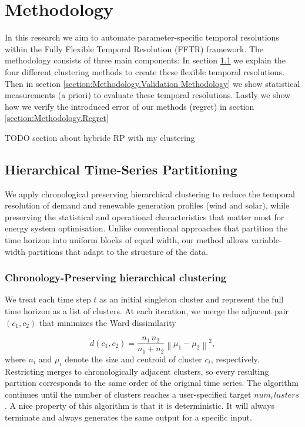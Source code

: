 \section{Methodology}
In this research we aim to automate parameter-specific temporal resolutions within the Fully Flexible Temporal Resolution (FFTR) framework. The methodology consists of three main components: 
In section \ref{section:Methodology.Hierarchical Time-Series Partitioning} we explain the four different clustering methods to create these flexible temporal resolutions. Then in section \ref{section:Methodology.Validation Methodology} we show statistical measurements (a priori) to evaluate these temporal resolutions. Lastly we show how we verify the introduced error of our methods (regret) in section \ref{section:Methodology.Regret} 

TODO section about hybride RP with my clustering

\subsection{Hierarchical Time-Series Partitioning}
\label{section:Methodology.Hierarchical Time-Series Partitioning}

We apply chronological preserving hierarchical clustering to reduce the temporal resolution of demand and renewable generation profiles (wind and solar), while preserving the statistical and operational characteristics that matter most for energy system optimisation. Unlike conventional approaches that partition the time horizon into uniform blocks of equal width, our method allows variable-width partitions that adapt to the structure of the data.

\subsubsection{Chronology-Preserving hierarchical clustering}

We treat each time step $t$ as an initial singleton cluster and represent the full time horizon as a list of clusters. At each iteration, we merge the adjacent pair $(c_1, c_2)$ that minimizes the Ward dissimilarity


\begin{equation}
\label{eq:ward_distance}
d(c_1, c_2) = \frac{n_1 \, n_2}{n_1 + n_2} \left\| \mu_1 - \mu_2 \right\|^2,
\end{equation}
\noindent
where $n_i$ and $\mu_i$ denote the size and centroid of cluster $c_i$, respectively. Restricting merges to chronologically adjacent clusters, so every resulting partition corresponds to the same order of the original time series. The algorithm continues until the number of clusters reaches a user-specified target $num_clusters$. A nice property of this algorithm is that it is deterministic. It will always terminate and always generates the same output for a specific input. 

